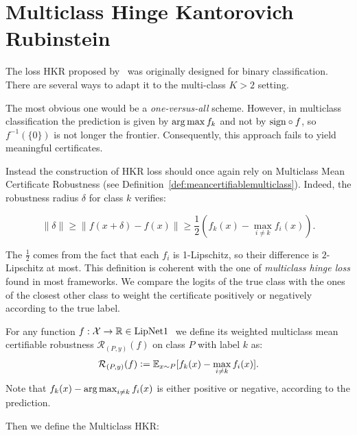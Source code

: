 \section{Multiclass Hinge Kantorovich Rubinstein}\label{app:multiclasshkr}

    The loss HKR proposed by~\cite{serrurier2020achieving} was originally designed for binary classification. There are several ways to adapt it to the multi-class $K>2$ setting.   
      
    The most obvious one would be a \textit{one-versus-all} scheme. However, in multiclass classification the prediction is given by $\operatorname*{arg\,max} f_k$ and not by $\text{sign}\circ f$, so $f^{-1}(\{0\})$ is not longer the frontier. Consequently, this approach fails to yield meaningful certificates.    
      
    Instead the construction of HKR loss should once again rely on Multiclass Mean Certificate Robustness (see Definition~\ref{def:meancertifiablemulticlass}). Indeed, the robustness radius $\delta$ for class $k$ verifies:
    
    $$\|\delta\|\geq \|f(x+\delta)-f(x)\|\geq\frac{1}{2}\left( f_k(x)-\max_{i\neq k}f_i(x)\right).$$
    
    The $\frac{1}{2}$ comes from the fact that each $f_i$ is 1-Lipschitz, so their difference is $2$-Lipschitz at most. This definition is coherent with the one of \textit{multiclass hinge loss} found in most frameworks. We compare the logits of the true class with the ones of the closest other class to weight the certificate positively or negatively according to the true label.
      
    \begin{definition}\label{def:meancertifiablemulticlass}
        For any function $f:\mathcal{X}\rightarrow\mathbb{R}\in\text{LipNet1 }$ we define its weighted multiclass mean certifiable robustness $\mathcal{R}_{(P,y)}(f)$ on class $P$ with label $k$ as:  
        \begin{equation}
            \mathcal{R}_{(P,y)}(f)\vcentcolon=\mathbb{E}_{x\sim P}[f_k(x)-\max_{i\neq k}f_i(x)].
        \end{equation} 
        Note that $f_k(x)-\operatorname*{arg\,max}_{i\neq k}f_i(x)$ is either positive or negative, according to the prediction.  
    \end{definition}  
    
    Then we define the Multiclass HKR:
      
